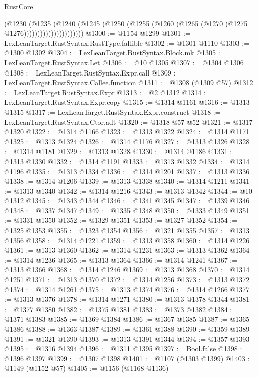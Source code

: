 \begin{lexlean}{RustCore}
\begin{coremodule}
                            (@1230
                              (@1235
                                (@1240
                                  (@1245
                                    (@1250
                                      (@1255 (@1260 (@1265 (@1270 (@1275 @1276))))))))))))))))))))))
@1300 := @1154 @1299
@1301 := LexLeanTarget.RustSyntax.RustType.fallible
@1302 := @1301 @1110
@1303 := @1300 @1302
@1304 := LexLeanTarget.RustSyntax.Block.mk
@1305 := LexLeanTarget.RustSyntax.Let
@1306 := @10 @1305
@1307 := @1304 @1306
@1308 := LexLeanTarget.RustSyntax.Expr.call
@1309 := LexLeanTarget.RustSyntax.Callee.function
@1311 := @1308 (@1309 @57)
@1312 := LexLeanTarget.RustSyntax.Expr
@1313 := @2 @1312
@1314 := LexLeanTarget.RustSyntax.Expr.copy
@1315 := @1314 @1161
@1316 := @1313 @1315
@1317 := LexLeanTarget.RustSyntax.Expr.construct
@1318 := LexLeanTarget.RustSyntax.Ctor.adt
@1320 := @1318 @57 @52
@1321 := @1317 @1320
@1322 := @1314 @1166
@1323 := @1313 @1322
@1324 := @1314 @1171
@1325 := @1313 @1324
@1326 := @1314 @1176
@1327 := @1313 @1326
@1328 := @1314 @1181
@1329 := @1313 @1328
@1330 := @1314 @1186
@1331 := @1313 @1330
@1332 := @1314 @1191
@1333 := @1313 @1332
@1334 := @1314 @1196
@1335 := @1313 @1334
@1336 := @1314 @1201
@1337 := @1313 @1336
@1338 := @1314 @1206
@1339 := @1313 @1338
@1340 := @1314 @1211
@1341 := @1313 @1340
@1342 := @1314 @1216
@1343 := @1313 @1342
@1344 := @10 @1312
@1345 := @1343 @1344
@1346 := @1341 @1345
@1347 := @1339 @1346
@1348 := @1337 @1347
@1349 := @1335 @1348
@1350 := @1333 @1349
@1351 := @1331 @1350
@1352 := @1329 @1351
@1353 := @1327 @1352
@1354 := @1325 @1353
@1355 := @1323 @1354
@1356 := @1321 @1355
@1357 := @1313 @1356
@1358 := @1314 @1221
@1359 := @1313 @1358
@1360 := @1314 @1226
@1361 := @1313 @1360
@1362 := @1314 @1231
@1363 := @1313 @1362
@1364 := @1314 @1236
@1365 := @1313 @1364
@1366 := @1314 @1241
@1367 := @1313 @1366
@1368 := @1314 @1246
@1369 := @1313 @1368
@1370 := @1314 @1251
@1371 := @1313 @1370
@1372 := @1314 @1256
@1373 := @1313 @1372
@1374 := @1314 @1261
@1375 := @1313 @1374
@1376 := @1314 @1266
@1377 := @1313 @1376
@1378 := @1314 @1271
@1380 := @1313 @1378 @1344
@1381 := @1377 @1380
@1382 := @1375 @1381
@1383 := @1373 @1382
@1384 := @1371 @1383
@1385 := @1369 @1384
@1386 := @1367 @1385
@1387 := @1365 @1386
@1388 := @1363 @1387
@1389 := @1361 @1388
@1390 := @1359 @1389
@1391 := @1321 @1390
@1393 := @1313 @1391 @1344
@1394 := @1357 @1393
@1395 := @1316 @1394
@1396 := @1311 @1395
@1397 := Bool.false
@1398 := @1396 @1397
@1399 := @1307 @1398
@1401 := @1107 (@1303 @1399)
@1403 := @1149 (@1152 @57)
@1405 := @1156 (@1168 @1136)

\end{coremodule}
\end{lexlean}
